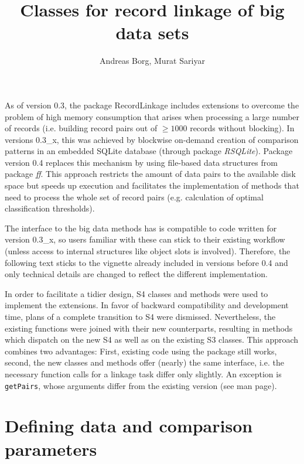 \documentclass[a4paper]{article}\usepackage[]{graphicx}\usepackage[]{color}
\begin{document}

\title{Classes for record linkage of big data sets}
\author{Andreas Borg, Murat Sariyar}

\maketitle

As of version 0.3, the package RecordLinkage includes extensions to overcome
the problem of high memory consumption that arises when processing a large
number of records (i.e. building record pairs out of $\geq{}1000$ records
without blocking). In versions 0.3\_x, this was achieved by blockwise on-demand
creation of comparison patterns in an embedded SQLite database (through
package \textit{RSQLite}). Package version 0.4 replaces this mechanism by using file-based
data structures from package \textit{ff}. This approach restricts the amount of
data pairs to the available disk space but speeds up execution and facilitates
the implementation of methods that need to process the whole set of record pairs
(e.g. calculation of optimal classification thresholds).

The interface to the big data methods has is compatible to code written
for version 0.3\_x, so users familiar with these can stick to their existing
workflow (unless access to internal structures like object slots is involved).
Therefore, the following text sticks to the vignette already included in versions
before 0.4 and only technical details are changed to reflect the different
implementation.

In order to facilitate a tidier design, S4 classes and methods were used to
implement the extensions. In favor of backward compatibility and development
time, plans of a complete transition to S4 were dismissed. Nevertheless, the
existing functions were joined with their new counterparts, resulting in
methods which dispatch on the new S4 as well as on the existing S3 classes.
This approach combines two advantages: First, existing code using the package
still works, second, the new classes and methods offer (nearly) the same
interface, i.e. the necessary function calls for a linkage task differ only
slightly. An exception is \texttt{getPairs}, whose arguments differ from the
existing version (see man page).


\section{Defining data and comparison parameters}
\end{document}

